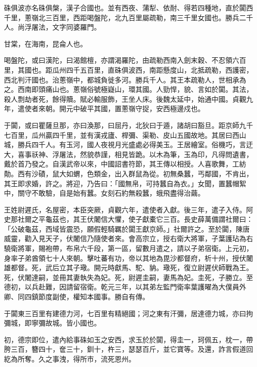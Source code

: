 \begin{pinyinscope}
 硃俱波亦名硃俱槃，漢子合國也。並有西夜、蒲犁、依耐、得若四種地，直於闐西千里，蔥嶺北三百里，西距喝盤陀，北九百里屬疏勒，南三千里女國也。勝兵二千人。尚浮屠法，文字同婆羅門。



 甘棠，在海南，昆侖人也。



 喝盤陀，或曰漢陀，曰渴館檀，亦謂渴羅陀，由疏勒西南入劍末穀、不忍領六百里，其國也。距瓜州四千五百里，直硃俱波西，南距懸度山，北抵疏勒，西護密，西北判汗國也。治蔥嶺中，都城負徙多河。勝兵千人。其王本疏勒人，世相承為之。西南即頭痛山也。蔥嶺俗號極嶷山，環其國。人勁悍，貌、言如於闐。其法，殺人剽劫者死，餘得贖。賦必輸服飾，王坐人床。後魏太延中，始通中國。貞觀九年，遣使者來朝。開元中破平其國，置蔥嶺守捉，安西極邊戍也。



 于闐，或曰瞿薩旦那，亦曰渙那，曰屈丹，北狄曰于遁，諸胡曰豁旦。距京師九千七百里，瓜州贏四千里，並有漢戎廬、桿彌、渠勒、皮山五國故地。其居曰西山城，勝兵四千人。有玉河，國人夜視月光盛處必得美玉。王居繪室。俗機巧，言迂大，喜事祅神、浮屠法，然貌恭謹，相見皆跪。以木為筆，玉為印，凡得問遺書，戴於首乃發之。自漢武帝以來，中國詔書符節，其王傳以相授。人喜歌舞，工紡勣。西有沙磧，鼠大如蝟，色類金，出入群鼠為從。初無桑蠶，丐鄰國，不肯出，其王即求婚，許之。將迎，乃告曰：「國無帛，可持蠶自為衣。」女聞，置蠶帽絮中，關守不敢驗，自是始有蠶。女刻石約無殺蠶，蛾飛盡得治繭。



 王姓尉遲氏，名屋密，本臣突厥，貞觀六年，遣使者入獻。後三年，遣子入侍。阿史那社爾之平龜茲也，其王伏闍信大懼，使子獻橐它三百。長史薛萬備謂社爾曰：「公破龜茲，西域皆震恐，願假輕騎羈於闐王獻京師。」社爾許之。至於闐，陳唐威靈，勸入見天子，伏闍信乃隨使者來。會高宗立，授右衛大將軍，子葉護玷為右驍衛將軍，賜袍帶，布帛六千段，第一區，留數月遣之，請以子弟宿衛。上元初，身率子弟酋領七十人來朝。擊吐蕃有功，帝以其地為毘沙都督府，析十州，授伏闍雄都督。死，武后立其子璥。開元時獻馬、駝、豽。璥死，復立尉遲伏師戰為王。死，伏闍達嗣，並冊其妻執失為妃。死，尉遲圭嗣，妻馬為妃。圭死，子勝立。至德初，以兵赴難，因請留宿衛。乾元三年，以其弟左監門衛率葉護曜為大僕員外卿、同四鎮節度副使，權知本國事。勝自有傳。



 于闐東三百里有建德力河，七百里有精絕國；河之東有汗彌，居達德力城，亦曰拘彌城，即寧彌故城。皆小國也。



 初，德宗即位，遣內給事硃如玉之安西，求玉於於闐，得圭一，珂佩五，枕一，帶胯三百，簪四十，奩三十，釧十，杵三，瑟瑟百斤，並它寶等。及還，詐言假道回紇為所奪。久之事洩，得所市，流死恩州。




\end{pinyinscope}
